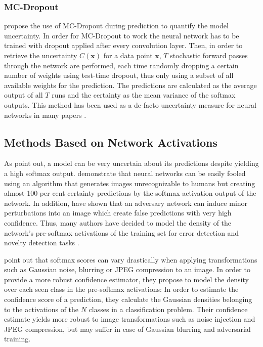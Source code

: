 \documentclass[10pt]{article}
\begin{document}
\subsubsection{MC-Dropout}
\textcite{ghahramani} propose the use of \gls{MC-Dropout} during prediction to quantify the model uncertainty. In order for \gls{MC-Dropout} to work the neural network has to be trained with dropout applied after every convolution layer. Then, in order to retrieve the uncertainty $C(\mathbf{x})$ for a data point $\mathbf{x}$,  $T$ stochastic forward passes through the network are performed, each time randomly dropping a certain number of weights using test-time dropout, thus only using a subset of all available weights for the prediction. The predictions are calculated as the average output of all $T$ runs and the certainty as the mean variance of the softmax outputs. This method has been used as a de-facto uncertainty measure for neural networks in many papers \cite{mandelbaum17, leibig2017, Lakshminarayanan16, subramanya, Kampffmeyer2016SemanticSO}.


\subsection{Methods Based on Network Activations}
\label{subsec:pre-softmax}
As \textcite{ghahramani} point out, a model can be very uncertain about its predictions despite yielding a high softmax output. \textcite{NguyenYC14} demonstrate that neural networks can be easily fooled using an algorithm that generates images unrecognizable to humans but creating almost-100 per cent certainty predictions by the softmax activation output of the network. In addition, \textcite{Goodfellow2014} have shown that an adversary network can induce minor perturbations into an image which create false predictions with very high confidence. Thus, many authors have decided to model the density of the network's pre-softmax activations of the training set for error detection and novelty detection tasks \cite{subramanya, mandelbaum17, Bishop1994NoveltyDA}.

\textcite{subramanya} point out that softmax scores can vary drastically when applying transformations such as Gaussian noise, blurring or JPEG compression to an image. In order to provide a more robust confidence estimator, they propose to model the density over each seen class in the pre-softmax activations: In order to estimate the confidence score of a prediction, they calculate the Gaussian densities belonging to the activations of the $N$ classes in a classification problem. Their confidence estimate yields more robust to image transformations such as noise injection and JPEG compression, but may suffer in case of Gaussian blurring and adversarial training.
\end{document}
